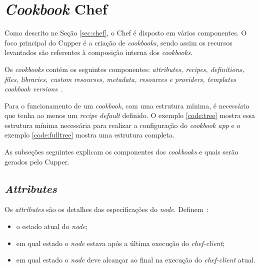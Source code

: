 \section{\textit{Cookbook} Chef}
\label{sec:lev-rec}

Como descrito ne Seção \ref{sec:chef}, o Chef é disposto em vários
componentes. O foco principal do Cupper é a criação de \textit{cookbooks},
sendo assim os recursos levantados são referentes à composição interna
dos \textit{cookbooks}.

Os \textit{cookbooks} contém os seguintes componentes: \textit{attributes, recipes, definitions,
files, libraries, custom resourses, metadata, resources e providers, templates
cookbook versions}~\cite{chefdoc:2016}.

Para o funcionamento de um \textit{cookbook}, com uma estrutura mínima, é necessário que tenha
ao menos um \textit{recipe default} definido. O exemplo \ref{code:tree} mostra essa
estrutura mínima necessária para realizar a configuração do \textit{cookbook app} e o exemplo
\ref{code:fulltree} mostra uma estrutura completa.

\noindent\begin{minipage}{.45\textwidth}
  
\end{minipage}\hfill
\noindent\begin{minipage}{.45\textwidth}
  
\end{minipage}

As subseções seguintes explicam os componentes dos \textit{cookbooks} e quais serão gerados
pelo Cupper.

\subsection{\textit{Attributes}}
\label{sec:lev-rec-att}

Os \textit{attributes} são os detalhes das especificações do \textit{node}. Definem~\cite{chefdoc:2016}:

\begin{itemize}
  \item o estado atual do \textit{node};
  \item em qual estado o \textit{node} estava após a última execução do \textit{chef-client};
  \item em qual estado o \textit{node} deve alcançar ao final na execução do \textit{chef-client} atual.
\end{itemize}

